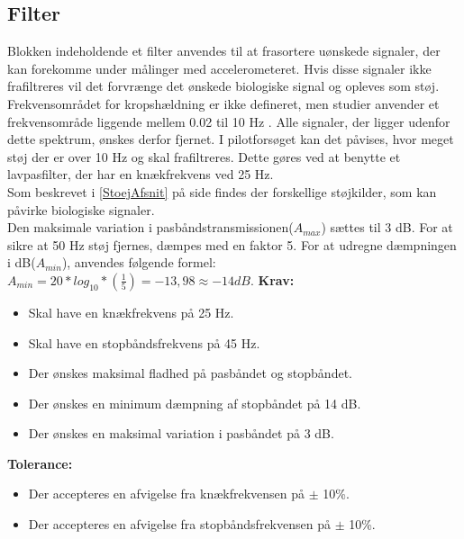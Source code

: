 \subsection{Filter}\label{FilterAfs}
Blokken indeholdende et filter anvendes til at frasortere uønskede signaler, der kan forekomme under målinger med accelerometeret. Hvis disse signaler ikke frafiltreres vil det forvrænge det ønskede biologiske signal og opleves som støj. Frekvensområdet for kropshældning er ikke defineret, men studier anvender et frekvensområde liggende mellem 0.02 til 10 Hz \cite{Martinez-Mendez2011}. Alle signaler, der ligger udenfor dette spektrum, ønskes derfor fjernet. I pilotforsøget kan det påvises, hvor meget støj der er over 10 Hz og skal frafiltreres. Dette gøres ved at benytte et lavpasfilter, der har en knækfrekvens ved 25 Hz. \\
Som beskrevet i \ref{StoejAfsnit} på side \pageref{StoejAfsnit} findes der forskellige støjkilder, som kan påvirke biologiske signaler. \\
Den maksimale variation i pasbåndstransmissionen($A_{max}$) sættes til 3 dB. For at sikre at 50 Hz støj fjernes, dæmpes med en faktor 5. For at udregne dæmpningen i dB($A_{min}$), anvendes følgende formel:
$A_{min}=20*log_{10}*(\frac{1}{5}) =-13,98 \approx -14 dB$.  
\textbf{Krav:}
\begin{itemize}
\item Skal have en knækfrekvens på 25 Hz.
\item Skal have en stopbåndsfrekvens på 45 Hz.
\item Der ønskes maksimal fladhed på pasbåndet og stopbåndet.
\item Der ønskes en minimum dæmpning af stopbåndet på 14 dB. 
\item Der ønskes en maksimal variation i pasbåndet på 3 dB. 
\end{itemize}
\textbf{Tolerance:}
\begin{itemize}
\item Der accepteres en afvigelse fra knækfrekvensen på $\pm$ 10\%.
\item Der accepteres en afvigelse fra stopbåndsfrekvensen på $\pm$ 10\%.
\end{itemize}
